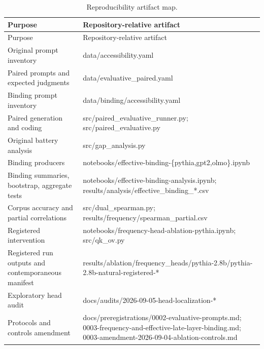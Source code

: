 \documentclass[
  english,
]{article}
\begin{document}
\begingroup\small
\begin{longtable}[]{@{}
  >{\raggedright\arraybackslash}p{}
  >{\raggedright\arraybackslash}p{}@{}}
\caption{Reproducibility artifact map. \label{tab:artifact-map}}\tabularnewline
\toprule\noalign{}
\begin{minipage}[b]{\linewidth}\raggedright
Purpose
\end{minipage} & \begin{minipage}[b]{\linewidth}\raggedright
Repository-relative artifact
\end{minipage} \\
\midrule\noalign{}
\endfirsthead
\toprule\noalign{}
\begin{minipage}[b]{\linewidth}\raggedright
Purpose
\end{minipage} & \begin{minipage}[b]{\linewidth}\raggedright
Repository-relative artifact
\end{minipage} \\
\midrule\noalign{}
\endhead
\bottomrule\noalign{}
\endlastfoot
Original prompt inventory & data/accessibility.yaml \\
Paired prompts and expected judgments & data/evaluative\_paired.yaml \\
Binding prompt inventory & data/binding/accessibility.yaml \\
Paired generation and coding & src/paired\_evaluative\_runner.py; src/paired\_evaluative.py \\
Original battery analysis & src/gap\_analysis.py \\
Binding producers & notebooks/effective-binding-\{pythia,gpt2,olmo\}.ipynb \\
Binding summaries, bootstrap, aggregate tests & notebooks/effective-binding-analysis.ipynb; results/analysis/effective\_binding\_*.csv \\
Corpus accuracy and partial correlations & src/dual\_spearman.py; results/frequency/spearman\_partial.csv \\
Registered intervention & notebooks/frequency-head-ablation-pythia.ipynb; src/qk\_ov.py \\
Registered run outputs and contemporaneous manifest & results/ablation/frequency\_heads/pythia-2.8b/pythia-2.8b-natural-registered-* \\
Exploratory head audit & docs/audits/2026-09-05-head-localization-* \\
Protocols and controls amendment & docs/preregistrations/0002-evaluative-prompts.md; 0003-frequency-and-effective-late-layer-binding.md; 0003-amendment-2026-09-04-ablation-controls.md \\
\end{longtable}
\endgroup
\end{document}
